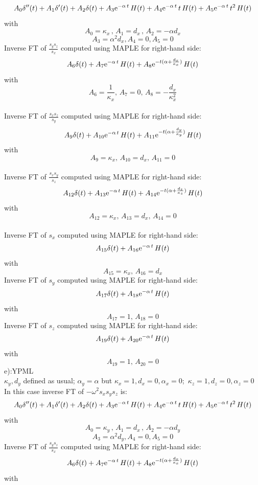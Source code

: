 \documentclass[onecolumn,extra]{gji_modified_cours_UPPA}
\begin{document}
$$A_0 \delta''(t) + A_1 \delta'(t) + A_2 \delta(t)
+ A_3 {\rm e}^{-\alpha\,t} \, H(t)
+ A_4 {\rm e}^{-\alpha\,t} \,t\, H(t)
+ A_5 {\rm e}^{-\alpha\,t} \,t^{2} \,H(t)$$
with
$$A_0 = \kappa_x \, , \, A_1 =d_x\, , \,A_2 = -\alpha d_x $$
$$A_3= \alpha ^2 d_x , A_4= 0, A_5=0 $$
\noindent
Inverse FT of $\frac{s_y s_z}{s_x}$ computed using MAPLE for right-hand side:\\
$$A_6\delta(t) + A_7 {\rm e}^{-\alpha\,t} \, H(t) + A_8 {\rm e}^{-t(\alpha+\frac{d_x}{\kappa_x})} \, H(t) $$
with
$$A_6=\frac{1}{\kappa_x},\,A_7=0,\,A_8=-\frac{d_x}{\kappa^2_x} $$\\
\noindent
Inverse FT of $\frac{s_x s_z}{s_y}$ computed using MAPLE for right-hand side:\\
$$A_9\delta(t) + A_{10} {\rm e}^{-\alpha\,t} \, H(t) + A_{11} {\rm e}^{-t(\alpha+\frac{d_y}{\kappa_y})} \, H(t) $$
with
$$A_9=\kappa_x,\,A_{10}=d_x,
\,A_{11}= 0 $$\\
\noindent
Inverse FT of $\frac{s_x s_y}{s_z}$ computed using MAPLE for right-hand side:\\
$$ A_{12}\delta(t) + A_{13} {\rm e}^{-\alpha\,t} \, H(t) + A_{14} {\rm e}^{-t(\alpha+\frac{d_z}{\kappa_z})} \, H(t) $$
with
$$A_{12}=\kappa_x ,\,A_{13}=d_x,
\,A_{14}=0$$\\
\noindent
Inverse FT of $s_x$ computed using MAPLE for right-hand side:
$$A_{15}\delta(t) + A_{16} {\rm e}^{-\alpha \,t} \, H(t) $$
with
$$A_{15}= \kappa_x, \, A_{16}=d_x $$
\noindent
Inverse FT of $s_y$ computed using MAPLE for right-hand side:
$$A_{17}\delta(t) + A_{18} {\rm e}^{-\alpha \,t} \, H(t) $$
with
$$A_{17}= 1, \, A_{18}=0 $$
\noindent
Inverse FT of $s_z$ computed using MAPLE for right-hand side:
$$A_{19}\delta(t) + A_{20} {\rm e}^{-\alpha \,t} \, H(t) $$
with
$$A_{19}= 1, \, A_{20}=0 $$
e):YPML\\
$\kappa_y,d_y$ defined as usual; $\alpha_y=\alpha$ but $\kappa_x = 1 ,d_x= 0,\alpha_x= 0$;$\,$ $\kappa_z = 1 ,d_z= 0,\alpha_z= 0$\\
In this case inverse FT of $-\omega^2 s_x s_y s_z$ is:
$$A_0 \delta''(t) + A_1 \delta'(t) + A_2 \delta(t)
+ A_3 {\rm e}^{-\alpha\,t} \, H(t)
+ A_4 {\rm e}^{-\alpha\,t} \,t\, H(t)
+ A_5 {\rm e}^{-\alpha\,t} \,t^{2} \,H(t)$$
with
$$A_0 = \kappa_y \, , \, A_1 =d_x\, , \,A_2 = -\alpha d_y $$
$$A_3= \alpha ^2 d_y , A_4= 0, A_5=0 $$
\noindent
Inverse FT of $\frac{s_y s_z}{s_x}$ computed using MAPLE for right-hand side:\\
$$A_6\delta(t) + A_7 {\rm e}^{-\alpha\,t} \, H(t) + A_8 {\rm e}^{-t(\alpha+\frac{d_x}{\kappa_x})} \, H(t) $$
with
\end{document}
